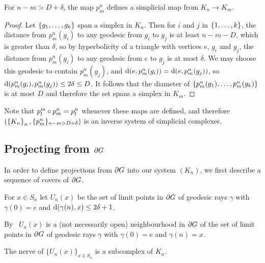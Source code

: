 \documentclass[a4paper]{article}
\begin{document}
\begin{lemma}\label{lem:psimplicial}
  For $n - m > D + \delta$, the map $p^n_m$ defines a simplicial map from
  $K_n \to K_m$.
\end{lemma}

\begin{proof}
  Let $\left\{g_1, \dotsc, g_k\right\}$ span a simplex in $K_n$.  Then for $i$ and
  $j$ in $\left\{1, \dotsc, k\right\}$, the distance from $p^n_m(g_i)$ to any
  geodesic from $g_i$ to $g_j$ is at least $n - m - D$, which is greater than
  $\delta$, so by hyperbolicity of a triangle with vertices $e$, $g_i$ and $g_j$,
  the distance from $p^n_m(g_i)$ to any geodesic from $e$ to $g_j$ is at most
  $\delta$. We may choose this geodesic to contain $p^n_m(g_j)$, and $\operatorname{d}(e,
  p^n_m(g_i)) = \operatorname{d}(e, p^n_m(g_j))$, so $\operatorname{d}(p^n_m(g_i), p^n_m(g_j)) \leq
  2\delta \leq D$.  It follows that the diameter of $\left\{p^n_m(g_1), \dotsc,
  p^n_m(g_k)\right\}$ is at most $D$ and therefore the set spans a simplex in $K_m$.
\end{proof}

\begin{remark}
  Note that $p^m_l \circ p^n_m = p^n_l$ whenever these maps are defined, and 
  therefore $(\left\{K_n\right\}_n, \{p^n_m\}_{n - m > D + \delta})$ is an inverse system 
  of simplicial complexes.
\end{remark}

\subsection{Projecting from $\partial G$}

In order to define projections from $\partial G$ into our system $(K_n)$, we
first describe a sequence of covers of $\partial G$.

\begin{definition}
  For $x \in S_n$ let $U_n(x)$ be the set of limit points in $\partial G$ of 
  geodesic rays $\gamma$ with $\gamma(0) = e$ and $\operatorname{d}(\gamma(n), x) \leq 
  2\delta+1$.  
  
  By~\cite[III.H.3.6]{bridsonhaefliger99} $U_n(x)$ is a (not necessarily open)
  neighbourhood in $\partial G$ of the set of limit points in $\partial G$ of
  geodesic rays $\gamma$ with $\gamma(0) = e$ and $\gamma(n) = x$.
\end{definition}

\begin{lemma}\label{lem:L_Ksimplicial}
  The nerve of $\{U_n(x)\}_{x \in S_n}$ is a subcomplex of $K_n$.
\end{lemma}
\end{document}
